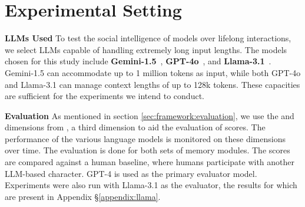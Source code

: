 \section{Experimental Setting}
\label{sec:experimental_setting}

\textbf{LLMs Used} \quad To test the social intelligence of models over lifelong interactions, we select LLMs capable of handling extremely long input lengths. The models chosen for this study include \textbf{Gemini-1.5}~\citep{geminiteam2023gemini}, \textbf{GPT-4o}~\citep{openai2024gpt4}, and \textbf{Llama-3.1}~\citep{dubey2024llama3herdmodels}. Gemini-1.5 can accommodate up to 1 million tokens as input, while both GPT-4o and Llama-3.1 can manage context lengths of up to 128k tokens. These capacities are sufficient for the experiments we intend to conduct.

\textbf{Evaluation} \quad As mentioned in section \ref{sec:framework:evaluation}, we use the \believability and \goalcompletion dimensions from \sotopiaeval, a third \believabilityextended dimension to aid the evaluation of \believability scores. The performance of the various language models is monitored on these dimensions over time. The evaluation is done for both sets of memory modules. The scores are compared against a human baseline, where humans participate with another LLM-based character. GPT-4 \citep{openai2024gpt4} is used as the primary evaluator model. Experiments were also run with Llama-3.1 \citep{dubey2024llama3herdmodels} as the evaluator, the results for which are present in Appendix \S \ref{appendix:llama}.


